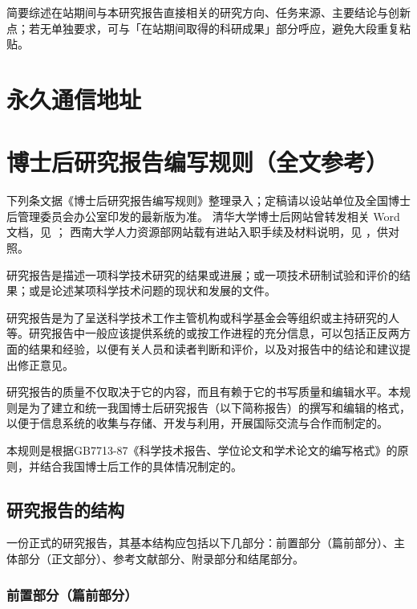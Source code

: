 \begin{resume}
简要综述在站期间与本研究报告直接相关的研究方向、任务来源、主要结论与创新点；若无单独要求，可与「在站期间取得的科研成果」部分呼应，避免大段重复粘贴。

\end{resume}

\chapter{永久通信地址}\label{app:postdoc-address}

\chapter{博士后研究报告编写规则（全文参考）}\label{app:postdoc-rules}
\begingroup
{\small
\noindent
下列条文据《博士后研究报告编写规则》整理录入；定稿请以设站单位及全国博士后管理委员会办公室印发的最新版为准。
清华大学博士后网站曾转发相关 Word 文档，见 \cite{tsinghua2021postdocrulesdoc}；
西南大学人力资源部网站载有进站入职手续及材料说明，见 \cite{swufe2025postdocworkflow}，供对照。\par
\vspace{\baselineskip}
}
研究报告是描述一项科学技术研究的结果或进展；或一项技术研制试验和评价的结果；或是论述某项科学技术问题的现状和发展的文件。

研究报告是为了呈送科学技术工作主管机构或科学基金会等组织或主持研究的人等。研究报告中一般应该提供系统的或按工作进程的充分信息，可以包括正反两方面的结果和经验，以便有关人员和读者判断和评价，以及对报告中的结论和建议提出修正意见。

研究报告的质量不仅取决于它的内容，而且有赖于它的书写质量和编辑水平。本规则是为了建立和统一我国博士后研究报告（以下简称报告）的撰写和编辑的格式，以便于信息系统的收集与存储、开发与利用，开展国际交流与合作而制定的。

本规则是根据GB7713-87《科学技术报告、学位论文和学术论文的编写格式》的原则，并结合我国博士后工作的具体情况制定的。

\section{研究报告的结构}

一份正式的研究报告，其基本结构应包括以下几部分：前置部分（篇前部分）、主体部分（正文部分）、参考文献部分、附录部分和结尾部分。

\subsection{前置部分（篇前部分）}


